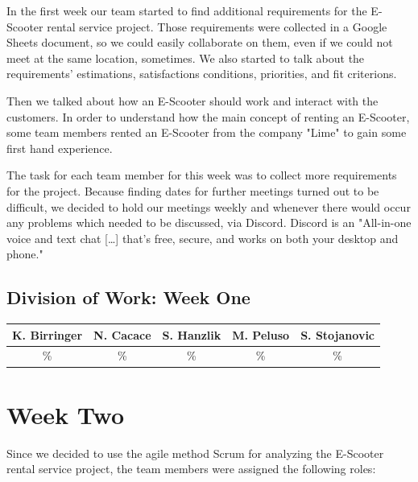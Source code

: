 \documentclass[a4paper, 12pt]{article}
\begin{document}
In the first week our team started to find additional requirements for the E-Scooter rental service project. Those requirements were collected in a Google Sheets document, so we could easily collaborate on them, even if we could not meet at the same location, sometimes. We also started to talk about the requirements' estimations, satisfactions conditions, priorities, and fit criterions.

Then we talked about how an E-Scooter should work and interact with the customers.
In order to understand how the main concept of renting an E-Scooter, some team members rented an E-Scooter from the company "Lime" to gain some first hand experience.

The task for each team member for this week was to collect more requirements for the project.
Because finding dates for further meetings turned out to be difficult, we decided to hold our meetings weekly and whenever there would occur any problems which needed to be discussed, via Discord. Discord is an "All-in-one voice and text chat [\ldots] that's free, secure, and works on both your desktop and phone."\cite{discord}

\subsection{Division of Work: Week One}
\begin{table}[h]
\centering
\setlength{\tabcolsep}{10pt}
\begin{tabular}{|c|c|c|c|c|}
\hline
K. Birringer & N. Cacace & S. Hanzlik & M. Peluso & S. Stojanovic\\
\hline
\% & \% & \% & \% & \% \\ 
\hline
\end{tabular}
\end{table}

\section{Week Two}
Since we decided to use the agile method Scrum for analyzing the E-Scooter rental service project, the team members were assigned the following roles:
\end{document}
